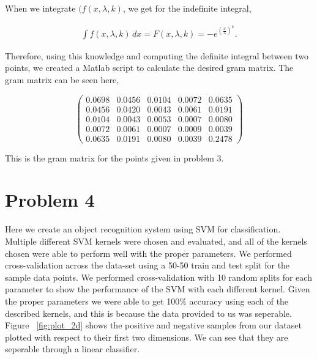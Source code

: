 \documentclass[paper=a4, fontsize=11pt]{scrartcl} %
\begin{document}
When we integrate $(f(x,\lambda,k)$, we get for the indefinite integral, 

\begin{align}
\int f(x,\lambda,k) \,dx = F(x,\lambda,k) = -e^{(\frac{x}{\lambda})^k}.
\end{align}

Therefore, using this knowledge and computing the definite integral between two points, we created a Matlab script to calculate the desired gram matrix.
The gram matrix can be seen here, 

\[ \left( \begin{array}{ccccc}
0.0698 & 0.0456 & 0.0104 & 0.0072 & 0.0635 \\
0.0456 & 0.0420 & 0.0043 & 0.0061 & 0.0191 \\
0.0104 & 0.0043 & 0.0053 & 0.0007 & 0.0080 \\
0.0072 & 0.0061 & 0.0007 & 0.0009 & 0.0039 \\
0.0635 & 0.0191 & 0.0080 & 0.0039 & 0.2478\end{array} \right)\] 

This is the gram matrix for the points given in problem 3.

\section{Problem 4}

Here we create an object recognition system using SVM for classification.
Multiple different SVM kernels were chosen and evaluated, and all of the kernels chosen were able to perform well with the proper parameters.  
We performed cross-validation across the data-set using a 50-50 train and test split for the sample data points.
We performed cross-validation with 10 random splits for each parameter to show the performance of the SVM with each different kernel.
Given the proper parameters we were able to get 100\% accuracy using each of the described kernels, and this is because the data provided to us was seperable.  
Figure ~\ref{fig:plot_2d} shows the positive and negative samples from our dataset plotted with respect to their first two dimensions.
We can see that they are seperable through a linear classifier.
\end{document}
